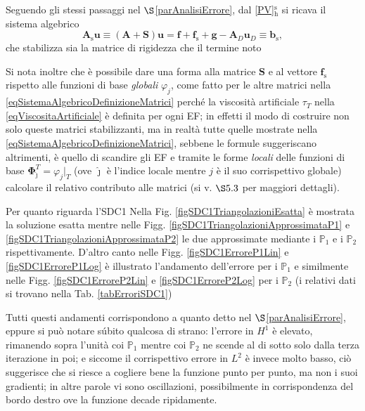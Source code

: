 \documentclass{article}
\newcommand{\teqref}[2]{\hyperref[#1]{#2}}
\begin{document}
                Seguendo gli stessi passaggi nel $\S$\ref{parAnalisiErrore}, dal \teqref{eqPSVariazionaleDiscreto}{[PV]$^{\text{s}}_\text{h}$} si ricava il sistema algebrico
                \begin{equation*}
                    \mathbf A_\text{s}\mathbf u\equiv
                    (\mathbf A+\mathbf S)\mathbf u=
                    \mathbf f+\mathbf f_\text{s}+\mathbf g-\mathbf A_D\mathbf u_D
                    \equiv\mathbf b_\text{s},
                    \label{eqSistemaAlgebricoStabilizzato}
                \end{equation*}
                che stabilizza sia la matrice di rigidezza che il termine noto
                
                Si nota inoltre che è possibile dare una forma alla matrice $\mathbf S$ e al vettore $\mathbf f_\text{s}$     rispetto alle funzioni di base \textit{globali} $\varphi_j$, come fatto per le altre matrici nella \eqref{eqSistemaAlgebricoDefinizioneMatrici} perché la viscosità artificiale $\tau_T$ nella \eqref{eqViscositaArtificiale} è definita per ogni EF; in effetti il modo di costruire non solo queste matrici stabilizzanti, ma in realtà tutte quelle mostrate nella \eqref{eqSistemaAlgebricoDefinizioneMatrici}, sebbene le formule suggeriscano altrimenti, è quello di scandire gli EF e tramite le forme \textit{locali} delle funzioni di base $\boldsymbol\Phi_{\hat\jmath}^T=\varphi_j\vert_T$ (ove $\hat\jmath$ è l'indice locale mentre $j$ è il suo corrispettivo globale) calcolare il relativo contributo alle matrici (si v. \cite{dispenseMEDèPA} $\S5.3$ per maggiori dettagli).

                Per quanto riguarda l'SDC1 Nella Fig. \ref{figSDC1TriangolazioniEsatta} è mostrata la soluzione esatta mentre nelle Figg. \ref{figSDC1TriangolazioniApprossimataP1} e \ref{figSDC1TriangolazioniApprossimataP2} le due approssimate mediante i $\mathbb P_1$ e i $\mathbb P_2$ rispettivamente. D'altro canto nelle Figg. \ref{figSDC1ErroreP1Lin} e \ref{figSDC1ErroreP1Log} è illustrato l'andamento dell'errore per i $\mathbb P_1$ e similmente nelle Figg. \ref{figSDC1ErroreP2Lin} e \ref{figSDC1ErroreP2Log} per i $\mathbb P_2$ (i relativi dati si trovano nella Tab. \ref{tabErroriSDC1})

                Tutti questi andamenti corrispondono a quanto detto nel $\S$\ref{parAnalisiErrore}, eppure si può notare súbito qualcosa di strano: l'errore in $H^1$ è elevato, rimanendo sopra l'unità coi $\mathbb P_1$ mentre coi $\mathbb P_2$ ne scende al di sotto solo dalla terza iterazione in poi; e siccome il corrispettivo errore in $L^2$ è invece molto basso, ciò suggerisce che si riesce a cogliere bene la funzione punto per punto, ma non i suoi gradienti; in altre parole vi sono oscillazioni, possibilmente in corrispondenza del bordo destro ove la funzione decade ripidamente.
\end{document}
